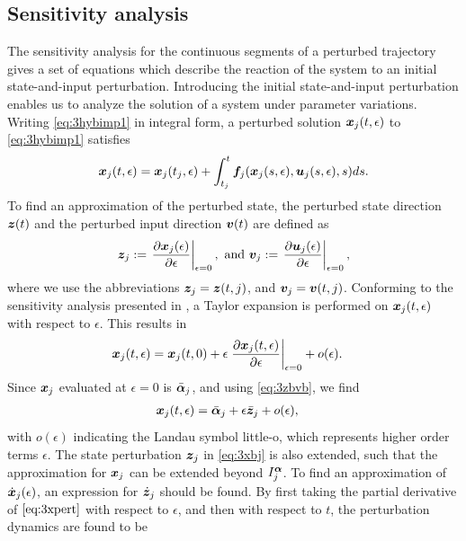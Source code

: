 \documentclass[../DC2019003Bouma.tex]{subfiles}
\begin{document}
\subsection{Sensitivity analysis}\label{sec:3sens}
The sensitivity analysis for the continuous segments of a perturbed trajectory gives a set of equations which describe the reaction of the system to an initial state-and-input perturbation. Introducing the initial state-and-input perturbation enables us to analyze the solution of a system under parameter variations. Writing \eqref{eq:3hybimp1} in integral form, a perturbed solution ${\boldsymbol{x}}_j(t,\epsilon)$ to \eqref{eq:3hybimp1} satisfies
\begin{align}
{\boldsymbol{x}}_j(t,\epsilon) = {\boldsymbol{x}}_j(t_j,\epsilon) + \int_{t_j}^{t}{\boldsymbol{f}}_j({\boldsymbol{x}}_j(s,\epsilon),{\boldsymbol{u}}_j(s,\epsilon),s)ds.\label{eq:3xpert}
\end{align}
To find an approximation of the perturbed state, the perturbed state direction ${\boldsymbol{z}}(t)$ and the perturbed input direction ${\boldsymbol{v}}(t)$ are defined as
\begin{align}
{\boldsymbol{z}}_j := \left.\frac{\partial{\boldsymbol{x}}_j(\epsilon)}{\partial\epsilon}\right|_{\epsilon=0},\text{ and } {\boldsymbol{v}}_j := \left.\frac{\partial{\boldsymbol{u}}_j(\epsilon)}{\partial\epsilon}\right|_{\epsilon=0},\label{eq:3zbvb}
\end{align}
where we use the abbreviations ${\boldsymbol{z}}_j = {\boldsymbol{z}}(t,j)$, and ${\boldsymbol{v}}_j = {\boldsymbol{v}}(t,j)$. Conforming to the sensitivity analysis presented in \cite{Khalil1996}, a Taylor expansion is performed on ${\boldsymbol{x}}_j(t,\epsilon)$ with respect to $\epsilon$. This results in
\begin{align}
{\boldsymbol{x}}_j(t,\epsilon) &= {\boldsymbol{x}}_j(t,0) + \epsilon\left.\frac{\partial{\boldsymbol{x}}_j(t,\epsilon)}{\partial\epsilon}\right|_{\epsilon=0} + o(\epsilon).\label{eq:3taylor}
\end{align}
Since ${\boldsymbol{x}}_j$ evaluated at $\epsilon=0$ is $\bar{\boldsymbol{\alpha}}_j$, and using \eqref{eq:3zbvb}, we find
\begin{align}
{\boldsymbol{x}}_j(t,\epsilon) &= \bar{\boldsymbol{\alpha}}_j + \epsilon\bar{{\boldsymbol{z}}}_j + o(\epsilon),\label{eq:3xbj}
\end{align}
with $o(\epsilon)$ indicating the Landau symbol little-o, which represents higher order terms $\epsilon$. The state perturbation ${\boldsymbol{z}}_j$ in \eqref{eq:3xbj} is also extended, such that the approximation for ${\boldsymbol{x}}_j$ can be extended beyond $I_j^{\boldsymbol{\alpha}}$. To find an approximation of $\dot{{\boldsymbol{x}}}_j(\epsilon)$, an expression for $\dot{{\boldsymbol{z}}}_j$ should be found. By first taking the partial derivative of $\eqref{eq:3xpert}$ with respect to $\epsilon$, and then with respect to $t$, the perturbation dynamics are found to be
\end{document}

